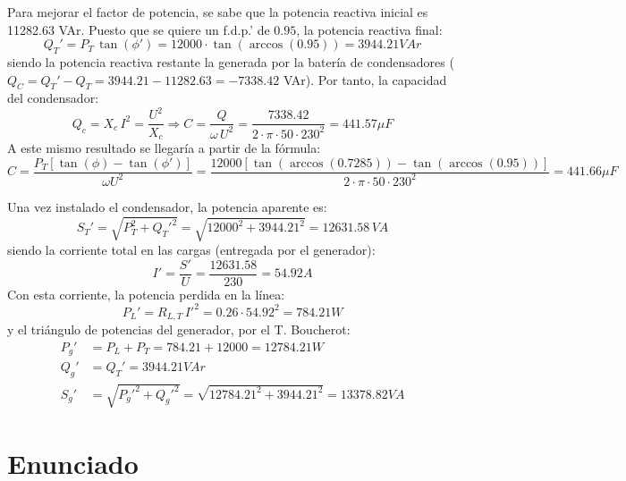 Para mejorar el factor de potencia, se sabe que la potencia reactiva
inicial es 11282.63 VAr. Puesto que se quiere un f.d.p.' de $0.95$, la
potencia reactiva final:
\begin{equation*}
  Q_T'=P_T\,\tan(\phi')=12000\cdot \tan(\arccos(0.95))=3944.21 VAr
\end{equation*} siendo
la potencia reactiva restante la generada por la batería de
condensadores ($Q_C=Q_T'-Q_T=3944.21-11282.63=-7338.42$ VAr). Por
tanto, la capacidad del condensador:
\begin{equation*}
  Q_c=X_c\,I^2=\dfrac{U^2}{X_c}\Rightarrow
  C=\dfrac{Q}{\omega\,U^2}=\dfrac{7338.42}{2\cdot\pi\cdot 50\cdot
    230^2}=441.57 \mu F
\end{equation*} A este
mismo resultado se llegaría a partir de la fórmula:
\begin{equation*}
  C=\frac{P_T \left[\tan (\phi) - \tan (\phi')\right]}{\omega
    U^2}=\dfrac{12000\left[\tan (\arccos(0.7285)) - \tan
      (\arccos(0.95))\right]}{2\cdot\pi\cdot 50\cdot 230^2}=441.66 \mu F
\end{equation*}

Una vez instalado el condensador, la potencia aparente es:
\begin{equation*}
  S_T'=\sqrt{P_T^2+Q_T'^2}=\sqrt{12000^2+3944.21^2}=12631.58\,VA
\end{equation*} siendo
la corriente total en las cargas (entregada por el generador):
\begin{equation*}
  I'=\dfrac{S'}{U}=\dfrac{12631.58}{230}=54.92 A
\end{equation*} Con esta
corriente, la potencia perdida en la línea:
\begin{equation*}
  P_L'=R_{L,T}\,I'^2=0.26\cdot 54.92^2=784.21W
\end{equation*} y el
triángulo de potencias del generador, por el T. Boucherot:
\begin{align*}
  P_g'&=P_L+P_T=784.21+12000=12784.21 W\\ Q_g'&=Q_T'=3944.21 VAr\\
  S_g'&=\sqrt{P_g'^2+Q_g'^2}=\sqrt{12784.21^2+3944.21^2}=13378.82 VA
\end{align*}


\section{Enunciado}

